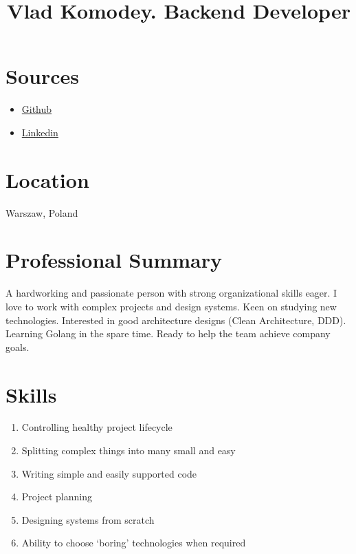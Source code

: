 \documentclass{article}
\title{Vlad Komodey. Backend Developer \vspace{-3em}}
\author{}
\date{}
\begin{document}
\maketitle
\thispagestyle{empty}
\section*{Sources\vspace{-0.5em}}
\begin{itemize}
    \item \href{https://github.com/vkomodey}{Github}
    \item \href{https://www.linkedin.com/in/vladislav-komodey-2b1b4aa0/}{Linkedin}
\end{itemize}

\vspace{-1em}
\section*{Location\vspace{-0.5em}} Warszaw, Poland

\section*{Professional Summary}

A hardworking and passionate person with strong organizational skills eager. I
love to work with complex projects and design systems. Keen on studying new
technologies. Interested in good architecture designs (Clean
Architecture, DDD). Learning Golang in the spare time.
Ready to help the team achieve company goals.

\vspace{-1.5em}
\section*{Skills}

\begin{multicols}{2}
\begin{enumerate}
    \item Controlling healthy project lifecycle
    \item Splitting complex things into many small and easy
    \item Writing simple and easily supported code
    \item Project planning
    \item Designing systems from scratch
    \item Ability to choose `boring' technologies when required
\end{enumerate}
\end{multicols}
\end{document}
